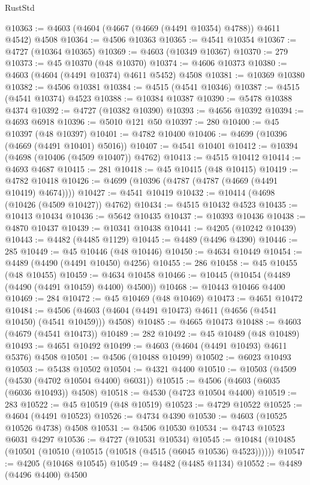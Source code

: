 \begin{lexlean}{RustStd}
\begin{coremodule}
@10363 := @4603 (@4604 (@4667 (@4669 (@4491 @10354) @4788)) @4611 @4542) @4508
@10364 := @4506 @10363
@10365 := @4541 @10354
@10367 := @4727 (@10364 @10365)
@10369 := @4603 (@10349 @10367)
@10370 := 279
@10373 := @45 @10370 (@48 @10370)
@10374 := @4606 @10373
@10380 := @4603 (@4604 (@4491 @10374) @4611 @5452) @4508
@10381 := @10369 @10380
@10382 := @4506 @10381
@10384 := @4515 (@4541 @10346)
@10387 := @4515 (@4541 @10374) @4523
@10388 := @10384 @10387
@10390 := @5478 @10388 @4374
@10392 := @4727 (@10382 @10390)
@10393 := @4656 @10392
@10394 := @4693 @6918
@10396 := @5010 @121 @50
@10397 := 280
@10400 := @45 @10397 (@48 @10397)
@10401 := @4782 @10400
@10406 := @4699 (@10396 (@4669 (@4491 @10401) @5016))
@10407 := @4541 @10401
@10412 := @10394 (@4698 (@10406 (@4509 @10407)) @4762)
@10413 := @4515 @10412
@10414 := @4693 @4687
@10415 := 281
@10418 := @45 @10415 (@48 @10415)
@10419 := @4782 @10418
@10426 := @4699 (@10396 (@4787 (@4787 (@4669 (@4491 @10419) @4674))))
@10427 := @4541 @10419
@10432 := @10414 (@4698 (@10426 (@4509 @10427)) @4762)
@10434 := @4515 @10432 @4523
@10435 := @10413 @10434
@10436 := @5642 @10435
@10437 := @10393 @10436
@10438 := @4870 @10437
@10439 := @10341 @10438
@10441 := @4205 (@10242 @10439)
@10443 := @4482 (@4485 @1129)
@10445 := @4489 (@4496 @4390)
@10446 := 285
@10449 := @45 @10446 (@48 @10446)
@10450 := @4634 @10449
@10454 := @4489 (@4490 (@4491 @10450) @4256)
@10455 := 286
@10458 := @45 @10455 (@48 @10455)
@10459 := @4634 @10458
@10466 := @10445 (@10454 (@4489 (@4490 (@4491 @10459) @4400) @4500))
@10468 := @10443 @10466 @4400
@10469 := 284
@10472 := @45 @10469 (@48 @10469)
@10473 := @4651 @10472
@10484 := @4506 (@4603 (@4604 (@4491 @10473) @4611 (@4656 (@4541 @10450) (@4541 @10459))) @4508)
@10485 := @4665 @10473
@10488 := @4603 (@4679 (@4541 @10473))
@10489 := 282
@10492 := @45 @10489 (@48 @10489)
@10493 := @4651 @10492
@10499 := @4603 (@4604 (@4491 @10493) @4611 @5376) @4508
@10501 := @4506 (@10488 @10499)
@10502 := @6023 @10493
@10503 := @5438 @10502
@10504 := @4321 @4400
@10510 := @10503 (@4509 (@4530 (@4702 @10504 @4400) @6031))
@10515 := @4506 (@4603 (@6035 (@6036 @10493)) @4508)
@10518 := @4530 (@4723 @10504 @4400)
@10519 := 283
@10522 := @45 @10519 (@48 @10519)
@10523 := @4729 @10522
@10525 := @4604 (@4491 @10523)
@10526 := @4734 @4390
@10530 := @4603 (@10525 @10526 @4738) @4508
@10531 := @4506 @10530
@10534 := @4743 @10523 @6031 @4297
@10536 := @4727 (@10531 @10534)
@10545 := @10484 (@10485 (@10501 (@10510 (@10515 (@10518 (@4515 (@6045 @10536) @4523))))))
@10547 := @4205 (@10468 @10545)
@10549 := @4482 (@4485 @1134)
@10552 := @4489 (@4496 @4400) @4500

\end{coremodule}
\end{lexlean}
